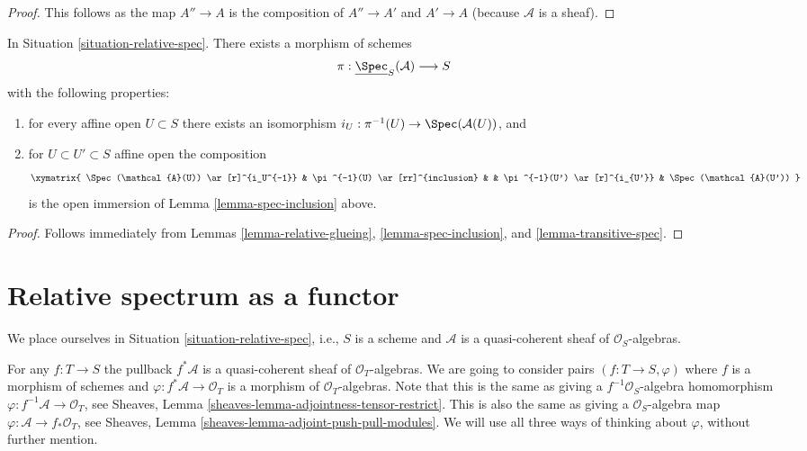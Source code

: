 \begin{proof}
This follows as the map $A'' \to A$ is the composition of $A'' \to A'$ and
$A' \to A$ (because $\mathcal{A}$ is a sheaf).
\end{proof}

\begin{lemma}
\label{lemma-glue-relative-spec}
In Situation \ref{situation-relative-spec}.
There exists a morphism of schemes
$$
\pi : \underline{\Spec}_S(\mathcal{A}) \longrightarrow S
$$
with the following properties:
\begin{enumerate}
\item for every affine open $U \subset S$ there exists an isomorphism
$i_U : \pi^{-1}(U) \to \Spec(\mathcal{A}(U))$, and
\item for $U \subset U' \subset S$ affine open the composition
$$
\xymatrix{
\Spec(\mathcal{A}(U)) \ar[r]^{i_U^{-1}} &
\pi^{-1}(U) \ar[rr]^{inclusion} & &
\pi^{-1}(U') \ar[r]^{i_{U'}} &
\Spec(\mathcal{A}(U'))
}
$$
is the open immersion of Lemma \ref{lemma-spec-inclusion} above.
\end{enumerate}
\end{lemma}

\begin{proof}
Follows immediately from
Lemmas \ref{lemma-relative-glueing},
\ref{lemma-spec-inclusion}, and
\ref{lemma-transitive-spec}.
\end{proof}












\section{Relative spectrum as a functor}
\label{section-spec}

\noindent
We place ourselves in Situation \ref{situation-relative-spec}, i.e.,
$S$ is a scheme and $\mathcal{A}$ is a quasi-coherent sheaf of
$\mathcal{O}_S$-algebras.

\medskip\noindent
For any $f : T \to S$ the pullback
$f^*\mathcal{A}$ is a quasi-coherent sheaf of $\mathcal{O}_T$-algebras.
We are going to consider pairs $(f : T \to S, \varphi)$ where
$f$ is a morphism of schemes and $\varphi : f^*\mathcal{A} \to \mathcal{O}_T$
is a morphism of $\mathcal{O}_T$-algebras. Note that this is the
same as giving a $f^{-1}\mathcal{O}_S$-algebra homomorphism
$\varphi : f^{-1}\mathcal{A} \to \mathcal{O}_T$, see
Sheaves, Lemma \ref{sheaves-lemma-adjointness-tensor-restrict}.
This is also the same as giving a $\mathcal{O}_S$-algebra map
$\varphi : \mathcal{A} \to f_*\mathcal{O}_T$, see
Sheaves, Lemma \ref{sheaves-lemma-adjoint-push-pull-modules}.
We will use all three ways of thinking about $\varphi$,
without further mention.

